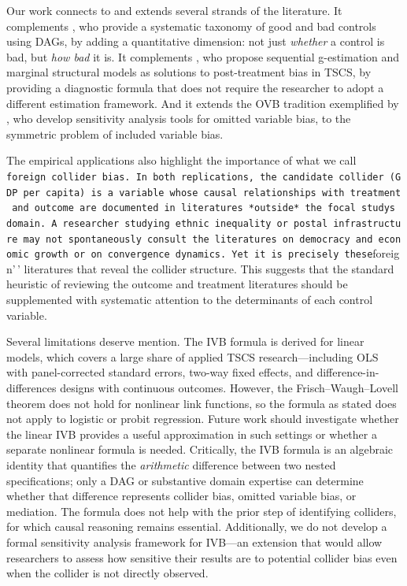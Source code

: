 \documentclass[
]{article}
\begin{document}
Our work connects to and extends several strands of the literature. It
complements \citet{cinelli2021crash}, who provide a systematic taxonomy
of good and bad controls using DAGs, by adding a quantitative dimension:
not just \emph{whether} a control is bad, but \emph{how bad} it is. It
complements \citet{blackwell2018make}, who propose sequential
g-estimation and marginal structural models as solutions to
post-treatment bias in TSCS, by providing a diagnostic formula that does
not require the researcher to adopt a different estimation framework.
And it extends the OVB tradition exemplified by
\citet{cinelli2020making}, who develop sensitivity analysis tools for
omitted variable bias, to the symmetric problem of included variable
bias.

The empirical applications also highlight the importance of what we call
\texttt{foreign\ collider\ bias.\textquotesingle{}\textquotesingle{}\ In\ both\ replications,\ the\ candidate\ collider\ (GDP\ per\ capita)\ is\ a\ variable\ whose\ causal\ relationships\ with\ treatment\ and\ outcome\ are\ documented\ in\ literatures\ *outside*\ the\ focal\ study\textquotesingle{}s\ domain.\ A\ researcher\ studying\ ethnic\ inequality\ or\ postal\ infrastructure\ may\ not\ spontaneously\ consult\ the\ literatures\ on\ democracy\ and\ economic\ growth\ or\ on\ convergence\ dynamics.\ Yet\ it\ is\ precisely\ these}foreign'\,'
literatures that reveal the collider structure. This suggests that the
standard heuristic of reviewing the outcome and treatment literatures
should be supplemented with systematic attention to the determinants of
each control variable.

Several limitations deserve mention. The IVB formula is derived for
linear models, which covers a large share of applied TSCS
research---including OLS with panel-corrected standard errors, two-way
fixed effects, and difference-in-differences designs with continuous
outcomes. However, the Frisch--Waugh--Lovell theorem does not hold for
nonlinear link functions, so the formula as stated does not apply to
logistic or probit regression. Future work should investigate whether
the linear IVB provides a useful approximation in such settings or
whether a separate nonlinear formula is needed. Critically, the IVB
formula is an algebraic identity that quantifies the \emph{arithmetic}
difference between two nested specifications; only a DAG or substantive
domain expertise can determine whether that difference represents
collider bias, omitted variable bias, or mediation. The formula does not
help with the prior step of identifying colliders, for which causal
reasoning remains essential. Additionally, we do not develop a formal
sensitivity analysis framework for IVB---an extension that would allow
researchers to assess how sensitive their results are to potential
collider bias even when the collider is not directly observed.
\end{document}
